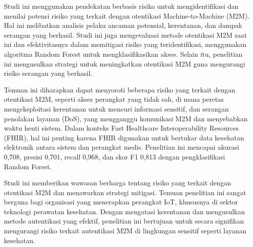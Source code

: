 Studi ini menggunakan pendekatan berbasis risiko untuk mengidentifikasi dan menilai potensi risiko yang terkait dengan otentikasi Machine-to-Machine (M2M). Hal ini melibatkan analisis pelaku ancaman potensial, kerentanan, dan dampak serangan yang berhasil. Studi ini juga mengevaluasi metode otentikasi M2M saat ini dan efektivitasnya dalam memitigasi risiko yang teridentifikasi, menggunakan algoritma Random Forest untuk mengklasifikasikan akses. Selain itu, penelitian ini mengusulkan strategi untuk meningkatkan otentikasi M2M guna mengurangi risiko serangan yang berhasil.

Temuan ini diharapkan dapat menyoroti beberapa risiko yang terkait dengan otentikasi M2M, seperti akses perangkat yang tidak sah, di mana peretas mengeksploitasi kerentanan untuk mencuri informasi sensitif, dan serangan penolakan layanan (DoS), yang mengganggu komunikasi M2M dan menyebabkan waktu henti sistem. Dalam konteks Fast Healthcare Interoperability Resources (FHIR), hal ini penting karena FHIR digunakan untuk bertukar data kesehatan elektronik antara sistem dan perangkat medis. Penelitian ini mencapai akurasi 0,708, presisi 0,701, recall 0,968, dan skor F1 0,813 dengan pengklasifikasi Random Forest.

Studi ini memberikan wawasan berharga tentang risiko yang terkait dengan otentikasi M2M dan menawarkan strategi mitigasi. Temuan penelitian ini sangat berguna bagi organisasi yang menerapkan perangkat IoT, khususnya di sektor teknologi perawatan kesehatan. Dengan mengatasi kerentanan dan mengusulkan metode autentikasi yang efektif, penelitian ini bertujuan untuk secara signifikan mengurangi risiko terkait autentikasi M2M di lingkungan sensitif seperti layanan kesehatan.